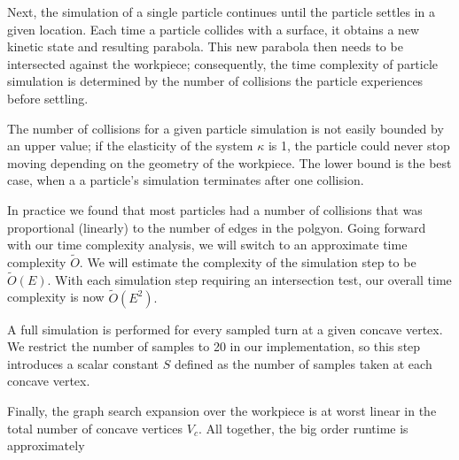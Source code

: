 Next, the simulation of a single particle continues until the particle settles in a given location. Each time a particle collides with a surface, it obtains a new kinetic state and resulting parabola. This new parabola then needs to be intersected against the workpiece; consequently, the time complexity of particle simulation is determined by the number of collisions the particle experiences before settling.

The number of collisions for a given particle simulation is not easily bounded by an upper value; if the elasticity of the system $\kappa$ is 1, the particle could never stop moving depending on the geometry of the workpiece. The lower bound is the best case, when a a particle's simulation terminates after one collision.

In practice we found that most particles had a number of collisions that was proportional (linearly) to the number of edges in the polgyon. Going forward with our time complexity analysis, we will switch to an approximate time complexity $\tilde{O}$. We will estimate the complexity of the simulation step to be $\tilde{O}(E)$. With each simulation step requiring an intersection test, our overall time complexity is now $\tilde{O}(E^2).$

A full simulation is performed for every sampled turn at a given concave vertex. We restrict the number of samples to 20 in our implementation, so this step introduces a scalar constant $S$ defined as the number of samples taken at each concave vertex.

Finally, the graph search expansion over the workpiece is at worst linear in the total number of concave vertices $V_{c}$. All together, the big order runtime is approximately

 {
  \label{eq:bigo}
}
